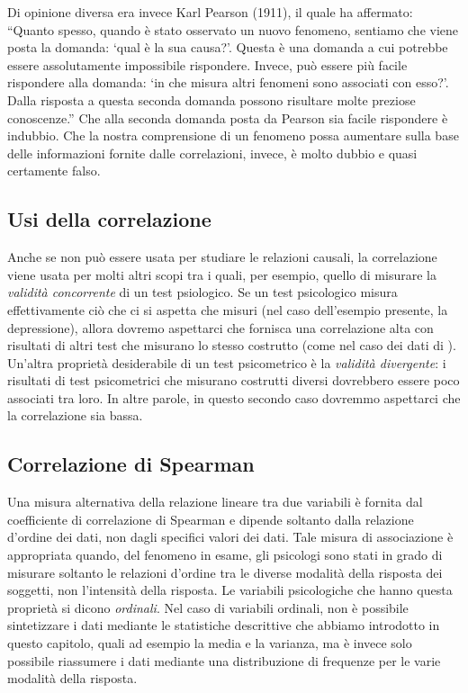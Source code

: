 Di opinione diversa era invece Karl Pearson (1911), il quale ha affermato: \enquote{Quanto spesso, quando è stato osservato un nuovo fenomeno, sentiamo che viene posta la domanda: \enquote{qual è la sua causa?}. 
Questa è una domanda a cui potrebbe essere assolutamente impossibile rispondere.
Invece, può essere più facile rispondere alla domanda: \enquote{in che misura altri fenomeni sono associati con esso?}. 
Dalla risposta a questa seconda domanda possono risultare molte preziose conoscenze.}
Che alla seconda domanda posta da Pearson sia facile rispondere è indubbio.
Che la nostra comprensione di un fenomeno possa aumentare sulla base delle informazioni fornite dalle correlazioni, invece, è molto dubbio e quasi certamente falso.


\subsection{Usi della correlazione}

Anche se non può essere usata per studiare le relazioni causali, la correlazione viene usata per molti altri scopi tra i quali, per esempio, quello di misurare la \emph{validità concorrente} di un test psiologico.
Se un test psicologico misura effettivamente ciò che ci si aspetta che misuri (nel caso dell'esempio presente, la depressione), allora dovremo aspettarci che fornisca una correlazione alta con risultati di altri test che misurano lo stesso costrutto (come nel caso dei dati di \citealp{zetsche_future_2019}).
Un'altra proprietà desiderabile di un test psicometrico è la \emph{validità divergente}: i risultati di test psicometrici che misurano costrutti diversi dovrebbero essere poco associati tra loro.
In altre parole, in questo secondo caso dovremmo aspettarci che la correlazione sia bassa.


\subsection{Correlazione di Spearman}

Una misura alternativa della relazione lineare tra due variabili è fornita dal coefficiente di correlazione di Spearman e dipende soltanto dalla relazione d'ordine dei dati, non dagli specifici valori dei dati.
Tale misura di associazione è appropriata quando, del fenomeno in esame, gli psicologi sono stati in grado di misurare soltanto le relazioni d'ordine tra le diverse modalità della risposta dei soggetti, non l'intensità della risposta.
Le variabili psicologiche che hanno questa proprietà si dicono \emph{ordinali}.
Nel caso di variabili ordinali, non è possibile sintetizzare i dati mediante le  statistiche descrittive che abbiamo introdotto in questo capitolo, quali ad esempio la media e la varianza, ma è invece solo possibile riassumere i dati mediante una distribuzione di frequenze per le varie modalità della risposta.


